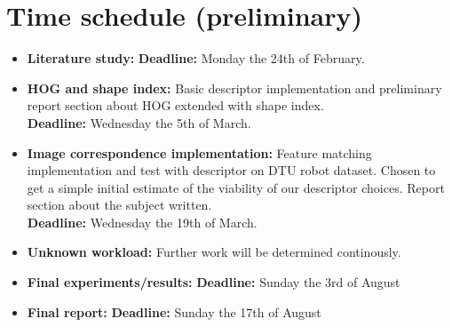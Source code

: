 \documentclass[11pt,a4paper]{article}
\begin{document}
\section{Time schedule \small{(preliminary)}}

\begin{itemize}
    \item{\textbf{Literature study:}
        \textbf{Deadline:} Monday the 24th of February.}
    \item{\textbf{HOG and shape index:} Basic descriptor implementation and
        preliminary report section about HOG extended with shape index. \\
        \textbf{Deadline:} Wednesday the 5th of March.}
    \item{\textbf{Image correspondence implementation:} Feature matching
        implementation and test with descriptor on DTU robot dataset. Chosen to
        get a simple initial estimate of the viability of our descriptor choices.
        Report section about the subject written. \\
        \textbf{Deadline:} Wednesday the 19th of March.}
    \item{\textbf{Unknown workload:} Further work will be determined
    continously.}
    \item{\textbf{Final experiments/results:}
        \textbf{Deadline:} Sunday the 3rd of August}
    \item{\textbf{Final report:}
        \textbf{Deadline:} Sunday the 17th of August}
\end{itemize}



\end{document}
